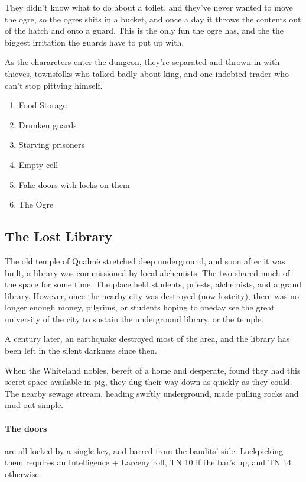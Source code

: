 \begin{multicols}{2}
\begin{boxtext}
\end{boxtext}

\noindent

They didn't know what to do about a toilet, and they've never wanted to move the ogre, so the ogres shits in a bucket, and once a day it throws the contents out of the hatch and onto a guard.  This is the only fun the ogre has, and the the biggest irritation the guards have to put up with.

As the chararcters enter the dungeon, they're separated and thrown in with thieves, townsfolks who talked badly about \gls{king}, and one indebted trader who can't stop pittying himself.

\begin{enumerate}

	\item{Food Storage}
	\item{Drunken guards}
	\item{Starving prisoners}
	\item{Empty cell}
	\item{Fake doors with locks on them}
	\item{The Ogre}

\end{enumerate}




\subsection{The Lost Library}\label{sewers}\setcounter{list}{0}

The old temple of Qualm\"{e} stretched deep underground, and soon after it was built, a library was commissioned by local alchemists.  The two shared much of the space for some time.  The place held students, priests, alchemists, and a grand library.  However, once the nearby city was destroyed (now \gls{lostcity}), there was no longer enough money, pilgrims, or students hoping to oneday see the great university of the city to sustain the underground library, or the temple.

A century later, an earthquake destroyed most of the area, and the library has been left in the silent darkness since then.

When the Whiteland nobles, bereft of a home and desperate, found they had this secret space available in \gls{pig}, they dug their way down as quickly as they could.  The nearby sewage stream, heading swiftly underground, made pulling rocks and mud out simple.

\paragraph{The doors} are all locked by a single key, and barred from the bandits' side.
Lockpicking them requires an Intelligence + Larceny roll, TN 10 if the bar's up, and TN 14 otherwise.

\end{multicols}

